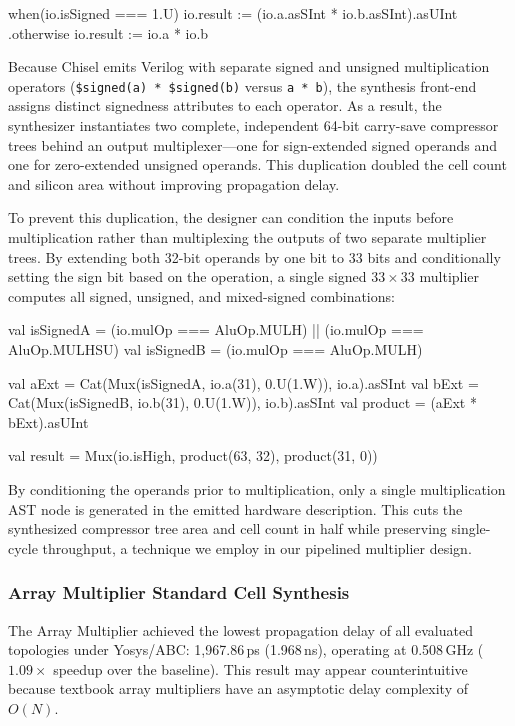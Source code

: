 \begin{chiselcode}
when(io.isSigned === 1.U) {
  io.result := (io.a.asSInt * io.b.asSInt).asUInt
}.otherwise {
  io.result := io.a * io.b
}
\end{chiselcode}

Because Chisel emits Verilog with separate signed and unsigned multiplication operators (\texttt{\$signed(a) * \$signed(b)} versus \texttt{a * b}), the synthesis front-end assigns distinct signedness attributes to each operator. As a result, the synthesizer instantiates two complete, independent 64-bit carry-save compressor trees behind an output multiplexer---one for sign-extended signed operands and one for zero-extended unsigned operands. This duplication doubled the cell count and silicon area without improving propagation delay.

To prevent this duplication, the designer can condition the inputs before multiplication rather than multiplexing the outputs of two separate multiplier trees. By extending both 32-bit operands by one bit to 33 bits and conditionally setting the sign bit based on the operation, a single signed $33 \times 33$ multiplier computes all signed, unsigned, and mixed-signed combinations:

\begin{chiselcode}
val isSignedA = (io.mulOp === AluOp.MULH) || (io.mulOp === AluOp.MULHSU)
val isSignedB = (io.mulOp === AluOp.MULH)

val aExt = Cat(Mux(isSignedA, io.a(31), 0.U(1.W)), io.a).asSInt
val bExt = Cat(Mux(isSignedB, io.b(31), 0.U(1.W)), io.b).asSInt
val product = (aExt * bExt).asUInt

val result = Mux(io.isHigh, product(63, 32), product(31, 0))
\end{chiselcode}

By conditioning the operands prior to multiplication, only a single multiplication AST node is generated in the emitted hardware description. This cuts the synthesized compressor tree area and cell count in half while preserving single-cycle throughput, a technique we employ in our pipelined multiplier design.

\subsubsection{Array Multiplier Standard Cell Synthesis}

The Array Multiplier achieved the lowest propagation delay of all evaluated topologies under Yosys/ABC: 1,967.86\,ps (1.968\,ns), operating at 0.508\,GHz ($1.09\times$ speedup over the baseline). This result may appear counterintuitive because textbook array multipliers have an asymptotic delay complexity of $O(N)$. 

